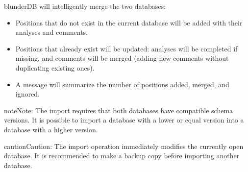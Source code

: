 \documentclass[letterpaper,10pt,english]{sphinxmanual}
\begin{document}
\sphinxAtStartPar
blunderDB will intelligently merge the two databases:
\begin{itemize}
\item {} 
\sphinxAtStartPar
Positions that do not exist in the current database will be added with their analyses and comments.

\item {} 
\sphinxAtStartPar
Positions that already exist will be updated: analyses will be completed if missing, and comments will be merged (adding new comments without duplicating existing ones).

\item {} 
\sphinxAtStartPar
A message will summarize the number of positions added, merged, and ignored.

\end{itemize}

\begin{sphinxadmonition}{note}{Note:}
\sphinxAtStartPar
The import requires that both databases have compatible schema versions. It is possible to import a database with a lower or equal version into a database with a higher version.
\end{sphinxadmonition}

\begin{sphinxadmonition}{caution}{Caution:}
\sphinxAtStartPar
The import operation immediately modifies the currently open database. It is recommended to make a backup copy before importing another database.
\end{sphinxadmonition}
\end{document}

